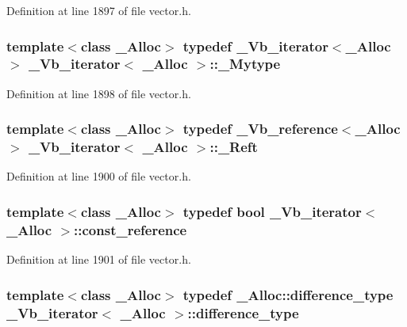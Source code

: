 Definition at line 1897 of file vector.\+h.

\hypertarget{class___vb__iterator_a2fff8ac5ba795d77033915aa2a358403}{
\subsubsection[{\+\_\+\+Mytype}]{\setlength{\rightskip}{0pt plus 5cm}template$<$class \+\_\+\+Alloc$>$ typedef {\bf \+\_\+\+Vb\+\_\+iterator}$<$\+\_\+\+Alloc$>$ {\bf \+\_\+\+Vb\+\_\+iterator}$<$ \+\_\+\+Alloc $>$\+::{\bf \+\_\+\+Mytype}}}\label{class___vb__iterator_a2fff8ac5ba795d77033915aa2a358403}


Definition at line 1898 of file vector.\+h.

\hypertarget{class___vb__iterator_a30e2e5d349b96c5988cd782e69c58161}{
\subsubsection[{\+\_\+\+Reft}]{\setlength{\rightskip}{0pt plus 5cm}template$<$class \+\_\+\+Alloc$>$ typedef {\bf \+\_\+\+Vb\+\_\+reference}$<$\+\_\+\+Alloc$>$ {\bf \+\_\+\+Vb\+\_\+iterator}$<$ \+\_\+\+Alloc $>$\+::{\bf \+\_\+\+Reft}}}\label{class___vb__iterator_a30e2e5d349b96c5988cd782e69c58161}


Definition at line 1900 of file vector.\+h.

\hypertarget{class___vb__iterator_ad346337dd66c8689d4017f3b74b7d50f}{
\subsubsection[{const\+\_\+reference}]{\setlength{\rightskip}{0pt plus 5cm}template$<$class \+\_\+\+Alloc$>$ typedef bool {\bf \+\_\+\+Vb\+\_\+iterator}$<$ \+\_\+\+Alloc $>$\+::{\bf const\+\_\+reference}}}\label{class___vb__iterator_ad346337dd66c8689d4017f3b74b7d50f}


Definition at line 1901 of file vector.\+h.

\hypertarget{class___vb__iterator_a148abf77b7a6501dc20581b9f4b1dfe4}{
\subsubsection[{difference\+\_\+type}]{\setlength{\rightskip}{0pt plus 5cm}template$<$class \+\_\+\+Alloc$>$ typedef \+\_\+\+Alloc\+::difference\+\_\+type {\bf \+\_\+\+Vb\+\_\+iterator}$<$ \+\_\+\+Alloc $>$\+::{\bf difference\+\_\+type}}}\label{class___vb__iterator_a148abf77b7a6501dc20581b9f4b1dfe4}


